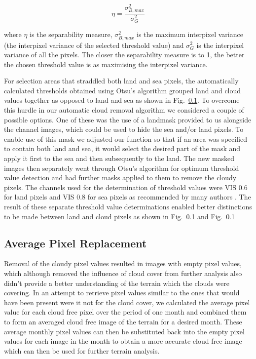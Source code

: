 \begin{equation}\label{eq:sepm}
    \eta = \frac{\sigma_{B,max}^{2}}{\sigma_{G}^{2}}
\end{equation}

where $\eta$ is the separability measure, $\sigma_{B,max}^{2}$ is the maximum interpixel variance (the interpixel variance of the selected threshold value) and $\sigma_{G}^{2}$ is the interpixel variance of all the pixels. The closer the separability measure is to 1, the better the chosen threshold value is as maximising the interpixel variance.

For selection areas that straddled both land and sea pixels, the automatically calculated thresholds obtained using Otsu's algorithm grouped land and cloud values together as opposed to land and sea as shown in Fig.~\ref{}. %
To overcome this hurdle in our automatic cloud removal algorithm we considered a couple of possible options. One of these was the use of a landmask provided to us alongside the channel images, which could be used to hide the sea and/or land pixels. To enable use of this mask we adjusted our function so that if an area was specified to contain both land and sea, it would select the desired part of the mask and apply it first to the sea and then subsequently to the land. The new masked images then separately went through Otsu's algorithm for optimum threshold value detection and had further masks applied to them to remove the cloudy pixels. The channels used for the determination of threshold values were VIS 0.6 for land pixels and VIS 0.8 for sea pixels as recommended by many authors \cite{}. 
The result of these separate threshold value determinations enabled better distinctions to be made between land and cloud pixels as shown in Fig.~\ref{} and Fig.~\ref{}

\subsection{Average Pixel Replacement}

Removal of the cloudy pixel values resulted in images with empty pixel values, which although removed the influence of cloud cover from further analysis also didn't provide a better understanding of the terrain which the clouds were covering. In an attempt to retrieve pixel values similar to the ones that would have been present were it not for the cloud cover, we calculated the average pixel value for each cloud free pixel over the period of one month and combined them to form an averaged cloud free image of the terrain for a desired month. These average monthly pixel values can then be substituted back into the empty pixel values for each image in the month to obtain a more accurate cloud free image which can then be used for further terrain analysis.

